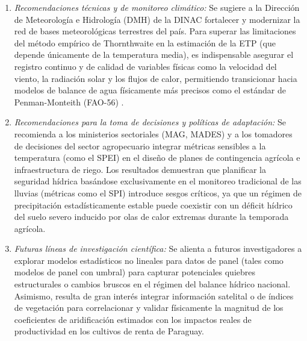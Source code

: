 \begin{enumerate}
    \item \textit{Recomendaciones técnicas y de monitoreo climático:} Se sugiere a la Dirección de Meteorología e Hidrología (DMH) de la DINAC fortalecer y modernizar la red de bases meteorológicas terrestres del país. Para superar las limitaciones del método empírico de Thornthwaite en la estimación de la ETP (que depende únicamente de la temperatura media), es indispensable asegurar el registro continuo y de calidad de variables físicas como la velocidad del viento, la radiación solar y los flujos de calor, permitiendo transicionar hacia modelos de balance de agua físicamente más precisos como el estándar de Penman-Monteith (FAO-56) \cite{allen1998crop}.
    
    \item \textit{Recomendaciones para la toma de decisiones y políticas de adaptación:} Se recomienda a los ministerios sectoriales (MAG, MADES) y a los tomadores de decisiones del sector agropecuario integrar métricas sensibles a la temperatura (como el SPEI) en el diseño de planes de contingencia agrícola e infraestructura de riego. Los resultados demuestran que planificar la seguridad hídrica basándose exclusivamente en el monitoreo tradicional de las lluvias (métricas como el SPI) introduce sesgos críticos, ya que un régimen de precipitación estadísticamente estable puede coexistir con un déficit hídrico del suelo severo inducido por olas de calor extremas durante la temporada agrícola.
    
    \item \textit{Futuras líneas de investigación científica:} Se alienta a futuros investigadores a explorar modelos estadísticos no lineales para datos de panel (tales como modelos de panel con umbral) para capturar potenciales quiebres estructurales o cambios bruscos en el régimen del balance hídrico nacional. Asimismo, resulta de gran interés integrar información satelital o de índices de vegetación para correlacionar y validar físicamente la magnitud de los coeficientes de aridificación estimados con los impactos reales de productividad en los cultivos de renta de Paraguay.
\end{enumerate}